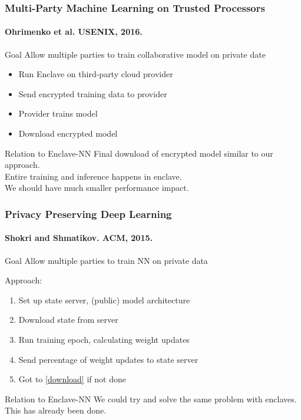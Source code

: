 \documentclass[aspectratio=169,nototalframenumber]{beamer}
\begin{document}
\begin{frame}
  \frametitle{Multi-Party Machine Learning on Trusted Processors}
  \framesubtitle{\small Ohrimenko et al. USENIX, 2016.}
  \begin{block}{Goal}
    Allow multiple parties to train collaborative model on private date
  \end{block}
  \pause
  \begin{itemize}
  \item Run Enclave on third-party cloud provider
  \item Send encrypted training data to provider
  \item Provider trains model
  \item Download encrypted model
  \end{itemize}
  \pause
  \begin{alertblock}{Relation to Enclave-NN}
    Final download of encrypted model similar to our approach.\\
    Entire training and inference happens in enclave.\\
    We should have much smaller performance impact.
  \end{alertblock}
\end{frame}


\begin{frame}
  \frametitle{Privacy Preserving Deep Learning}
  \framesubtitle{\small Shokri and Shmatikov. ACM, 2015.}
  \begin{block}{Goal}
    Allow multiple parties to train NN on private data
  \end{block}
  \pause
  Approach:
  \begin{enumerate}
  \item Set up state server, (public) model architecture
  \item \label{download} Download state from server
  \item Run training epoch, calculating weight updates
  \item Send percentage of weight updates to state server
  \item Got to \ref{download} if not done
  \end{enumerate}
  \pause
  \begin{alertblock}{Relation to Enclave-NN}
    We could try and solve the same problem with enclaves.\\
    This has already been done.
  \end{alertblock}
\end{frame}
\end{document}
